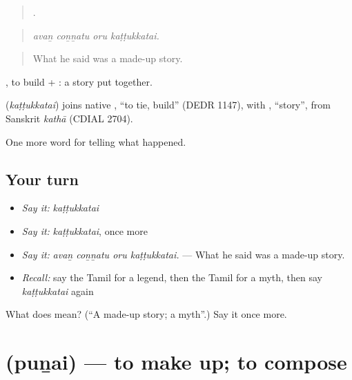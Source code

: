 \begin{quote}
   .
\end{quote}

\begin{quote}
\emph{avaṉ coṉṉatu oru kaṭṭukkatai.}
\end{quote}

\begin{quote}
What he said was a made-up story.
\end{quote}

, to build + : a story put together.

\begin{cousinweb}
\textbf{} (\emph{kaṭṭukkatai}) joins native , \textquotedblleft{}to tie, build\textquotedblright{} (DEDR 1147), with , \textquotedblleft{}story\textquotedblright{}, from Sanskrit \emph{kathā} (CDIAL 2704).
\end{cousinweb}

\begin{grammarlens}[title={What you've built}]
One more word for telling what happened.
\end{grammarlens}

\subsection*{Your turn}
\begin{itemize}
\raggedright
  \item \emph{Say it:} \emph{kaṭṭukkatai}
  \item \emph{Say it:} \emph{kaṭṭukkatai}, once more
  \item \emph{Say it:} \emph{avaṉ coṉṉatu oru kaṭṭukkatai.} — What he said was a made-up story.
  \item \emph{Recall:} say the Tamil for a legend, then the Tamil for a myth, then say \emph{kaṭṭukkatai} again
\end{itemize}

\begin{tcolorbox}[breakable,colback=teal!4,colframe=teal!35!black,title={Before you move on}]
What does  mean? (\textquotedblleft{}A made-up story; a myth\textquotedblright{}.) Say it once more.
\end{tcolorbox}
\section[\texorpdfstring{\ta{புனை} (puṉai)}{புனை (puṉai)}]{ (puṉai) — to make up; to compose}

